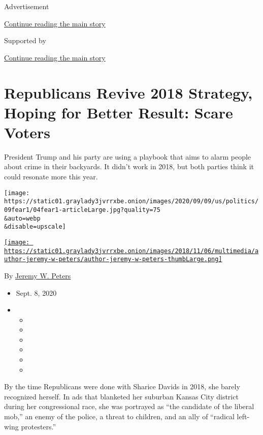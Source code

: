 Advertisement

\protect\hyperlink{after-top}{Continue reading the main story}

Supported by

\protect\hyperlink{after-sponsor}{Continue reading the main story}

\hypertarget{republicans-revive-2018-strategy-hoping-for-better-result-scare-voters}{%
\section{Republicans Revive 2018 Strategy, Hoping for Better Result:
Scare
Voters}\label{republicans-revive-2018-strategy-hoping-for-better-result-scare-voters}}

President Trump and his party are using a playbook that aims to alarm
people about crime in their backyards. It didn't work in 2018, but both
parties think it could resonate more this year.

\texttt{[image: https://static01.graylady3jvrrxbe.onion/images/2020/09/09/us/politics/09fear1/04fear1-articleLarge.jpg?quality=75\\\&auto=webp\\\&disable=upscale]}

\href{https://www.nytimes3xbfgragh.onion/by/jeremy-w-peters}{\texttt{[image: https://static01.graylady3jvrrxbe.onion/images/2018/11/06/multimedia/author-jeremy-w-peters/author-jeremy-w-peters-thumbLarge.png]}}

By \href{https://www.nytimes3xbfgragh.onion/by/jeremy-w-peters}{Jeremy
W. Peters}

\begin{itemize}
\item
  Sept. 8, 2020
\item
  \begin{itemize}
  \item
  \item
  \item
  \item
  \item
  \item
  \end{itemize}
\end{itemize}

By the time Republicans were done with Sharice Davids in 2018, she
barely recognized herself. In ads that blanketed her suburban Kansas
City district during her congressional race, she was portrayed as ``the
candidate of the liberal mob,'' an enemy of the police, a threat to
children, and an ally of ``radical left-wing protesters.''

